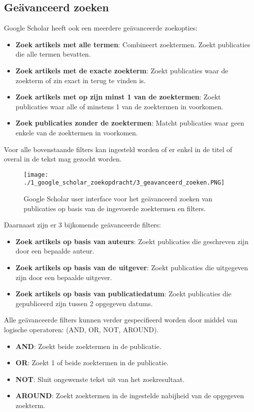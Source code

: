 \subsection{Geävanceerd zoeken}
Google Scholar heeft ook een meerdere geävanceerde zoekopties:
\begin{itemize}
    \item \textbf{Zoek artikels met alle termen}: Combineert zoektermen. Zoekt publicaties die alle termen bevatten.
    \item \textbf{Zoek artikels met de exacte zoekterm}: Zoekt publicaties waar de zoekterm of zin exact in terug te vinden is.
    \item \textbf{Zoek artikels met op zijn minst 1 van de zoektermen}: Zoekt publicaties waar alle of minstens 1 van de zoektermen in voorkomen.
    \item \textbf{Zoek publicaties zonder de zoektermen}: Matcht publicaties waar geen enkele van de zoektermen in voorkomen.
\end{itemize}
Voor alle bovenstaande filters kan ingesteld worden of er enkel in de titel of overal in de tekst mag gezocht worden.

\begin{figure}
    \centering
    \texttt{[image: ./1\_google\_scholar\_zoekopdracht/3\_geavanceerd\_zoeken.PNG]}
    \caption[Google Scholar geävanceerd zoeken.]{\label{fig:Google Scholar geävanceerd zoek}Google Scholar user interface voor het geävanceerd zoeken van publicaties op basis van de ingevoerde zoektermen en filters.}
\end{figure}

\linebreak
Daarnaast zijn er 3 bijkomende geävanceerde filters:
\begin{itemize}
    \item \textbf{Zoek artikels op basis van auteurs}: Zoekt publicaties die geschreven zijn door een bepaalde auteur.
    \item \textbf{Zoek artikels op basis van de uitgever}: Zoekt publicaties die uitgegeven zijn door een bepaalde uitgever.
    \item \textbf{Zoek artikels op basis van publicatiedatum}: Zoekt publicaties die gepubliceerd zijn tussen 2 opgegeven datums.
\end{itemize}

Alle geävanceerde filters kunnen verder gespecifieerd worden door middel van logische operatoren: (AND, OR, NOT, AROUND).
\begin{itemize}
    \item \textbf{AND}: Zoekt beide zoektermen in de publicatie.
    \item \textbf{OR}: Zoekt 1 of beide zoektermen in de publicatie.
    \item \textbf{NOT}: Sluit ongewenste tekst uit van het zoekresultaat.
    \item \textbf{AROUND}: Zoekt zoektermen in de ingestelde nabijheid van de opgegeven zoekterm.
\end{itemize}

